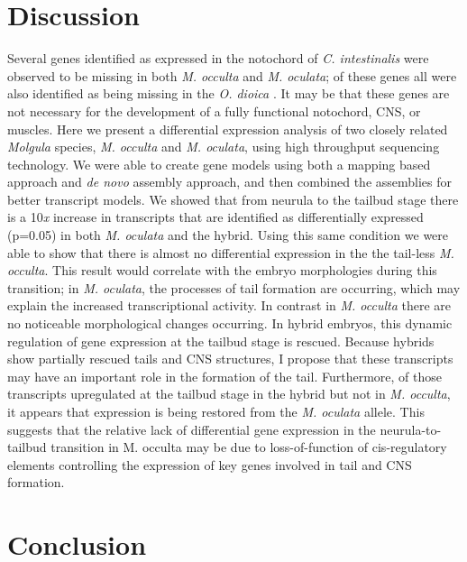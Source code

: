 \section{Discussion}
Several genes identified as expressed in the notochord of \textit{C. intestinalis} \cite{hotta_characterization_2000,hotta_brachyury-downstream_2007} were observed to be missing in both \textit{M. occulta} and \textit{M. oculata}; of these genes all were also identified as being missing in the \textit{O. dioica} \cite{kugler_evolutionary_2011}. It may be that these genes are not necessary for the development of a fully functional notochord, CNS, or muscles.
Here we present a differential expression analysis of two closely related \textit{Molgula} species, \textit{M. occulta} and \textit{M. oculata}, using high throughput sequencing technology. We were able to create gene models using both a mapping based approach and \textit{de novo} assembly approach, and then combined the assemblies for better transcript models. We showed that from neurula to the tailbud stage there is a 10\textit{x} increase in transcripts that are identified as differentially expressed (p=0.05) in both \textit{M. oculata} and the hybrid. Using this same condition we were able to show that there is almost no differential expression in the the tail-less \textit{M. occulta}. This result would correlate with the embryo morphologies during this transition; in \textit{M. oculata}, the processes of tail formation are occurring, which may explain the increased transcriptional activity. In contrast in \textit{M. occulta} there are no noticeable morphological changes occurring. In hybrid embryos, this dynamic regulation of gene expression at the tailbud stage is rescued. Because hybrids show partially rescued tails and CNS structures, I propose that these transcripts may have an important role in the formation of the tail. Furthermore, of those transcripts upregulated at the tailbud stage in the hybrid but not in \textit{M. occulta}, it appears that expression is being restored from the \textit{M. oculata} allele.  This suggests that the relative lack of differential gene expression in the neurula-to-tailbud transition in M. occulta may be due to loss-of-function of cis-regulatory elements controlling the expression of key genes involved in tail and CNS formation.

\section{Conclusion}

